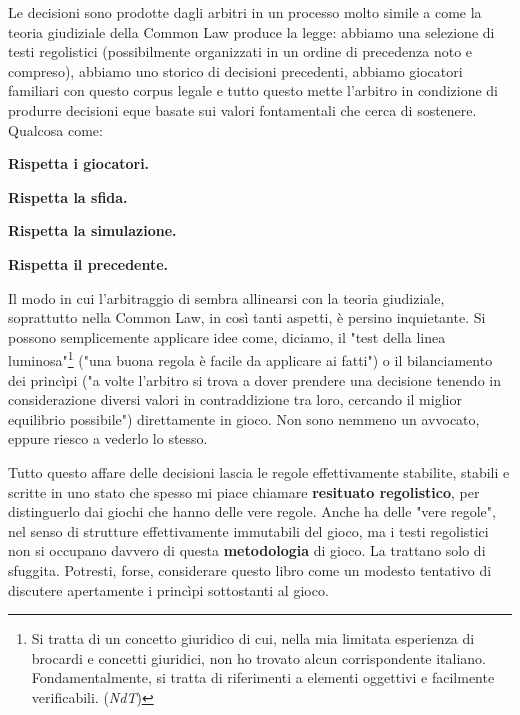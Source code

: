 Le decisioni sono prodotte dagli arbitri in un processo molto simile a come la teoria giudiziale della Common Law produce la legge: abbiamo una selezione di testi regolistici (possibilmente organizzati in un ordine di precedenza noto e compreso), abbiamo uno storico di decisioni precedenti, abbiamo giocatori familiari con questo corpus legale e tutto questo mette l'arbitro in condizione di produrre decisioni eque basate sui valori fontamentali che cerca di sostenere. Qualcosa come:

\textbf{Rispetta i giocatori.}

\textbf{Rispetta la sfida.}

\textbf{Rispetta la simulazione.}

\textbf{Rispetta il precedente.}

Il modo in cui l'arbitraggio di \dnd{} sembra allinearsi con la teoria giudiziale, soprattutto nella Common Law, in così tanti aspetti, è persino inquietante. Si possono semplicemente applicare idee come, diciamo, il "test della linea luminosa"\footnote[3]{Si tratta di un concetto giuridico di cui, nella mia limitata esperienza di brocardi e concetti giuridici, non ho trovato alcun corrispondente italiano. Fondamentalmente, si tratta di riferimenti a elementi oggettivi e facilmente verificabili. (\textit{NdT})} ("una buona regola è facile da applicare ai fatti") o il bilanciamento dei princìpi ("a volte l'arbitro si trova a dover prendere una decisione tenendo in considerazione diversi valori in contraddizione tra loro, cercando il miglior equilibrio possibile") direttamente in gioco. Non sono nemmeno un avvocato, eppure riesco a vederlo lo stesso.


Tutto questo affare delle decisioni lascia le regole effettivamente stabilite, stabili e scritte in uno stato che spesso mi piace chiamare \textbf{resituato regolistico}, per distinguerlo dai giochi che hanno delle vere regole. Anche \dnd{} ha delle "vere regole", nel senso di strutture effettivamente immutabili del gioco, ma i testi regolistici non si occupano davvero di questa \textbf{metodologia} di gioco. La trattano solo di sfuggita. Potresti, forse, considerare questo libro come un modesto tentativo di discutere apertamente i princìpi sottostanti al gioco.

